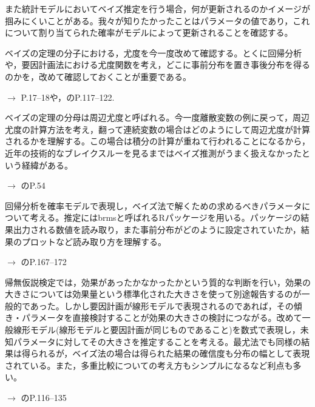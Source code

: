 


また統計モデルにおいてベイズ推定を行う場合，何が更新されるのかイメージが掴みにくいことがある。我々が知りたかったことはパラメータの値であり，これについて割り当てられた確率がモデルによって更新されることを確認する。


\item[尤度] ベイズの定理の分子における，尤度を今一度改めて確認する。とくに回帰分析や，要因計画法における尤度関数を考え，どこに事前分布を置き事後分布を得るのかを，改めて確認しておくことが重要である。
\begin{flushright}
	$\to$ \textcite{Toyoda201606}P.17--18や，\textcite{kosugi2018}のP.117--122.
\end{flushright}

\item[周辺尤度]ベイズの定理の分母は周辺尤度と呼ばれる。今一度離散変数の例に戻って，周辺尤度の計算方法を考え，翻って連続変数の場合はどのようにして周辺尤度が計算されるかを理解する。この場合は積分の計算が重ねて行われることになるから，近年の技術的なブレイクスルーを見るまではベイズ推測がうまく扱えなかったという経緯がある。
\begin{flushright}
	$\to$ \textcite{Baba201907}のP.54
\end{flushright}


\item[回帰分析と尤度]回帰分析を確率モデルで表現し，ベイズ法で解くための求めるべきパラメータについて考える。推定にはbrmsと呼ばれるRパッケージを用いる。パッケージの結果出力される数値を読み取り，また事前分布がどのように設定されていたか，結果のプロットなど読み取り方を理解する。
\begin{flushright}
	$\to$ \textcite{Baba201907}のP.167--172
\end{flushright}


\item[要因計画と推定]帰無仮説検定では，効果があったかなかったかという質的な判断を行い，効果の大きさについては効果量という標準化された大きさを使って別途報告するのが一般的であった。しかし要因計画が線形モデルで表現されるのであれば，その傾き・パラメータを直接検討することが効果の大きさの検討につながる。改めて一般線形モデル(線形モデルと要因計画が同じものであること)を数式で表現し，未知パラメータに対してその大きさを推定することを考える。最尤法でも同様の結果は得られるが，ベイズ法の場合は得られた結果の確信度も分布の幅として表現されている。また，多重比較についての考え方もシンプルになるなど利点も多い。
\begin{flushright}
	$\to$ \textcite{Toyoda201606}のP.116--135
\end{flushright}


